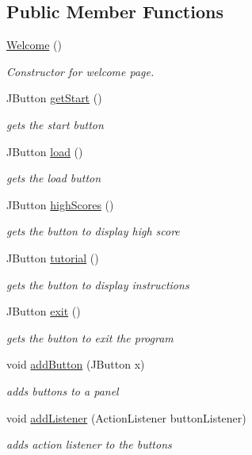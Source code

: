\subsection*{Public Member Functions}
\begin{DoxyCompactItemize}
\item 
\hyperlink{classview_1_1_welcome_ac0d0158b691ccb4dbca2c78145e4a522}{Welcome} ()
\begin{DoxyCompactList}\small\item\em Constructor for welcome page. \end{DoxyCompactList}\item 
J\+Button \hyperlink{classview_1_1_welcome_a8375f9965fb6662e612ea02af51a51a9}{get\+Start} ()
\begin{DoxyCompactList}\small\item\em gets the start button \end{DoxyCompactList}\item 
J\+Button \hyperlink{classview_1_1_welcome_a4a6c30be81cc7a3b081d3e97a4c84356}{load} ()
\begin{DoxyCompactList}\small\item\em gets the load button \end{DoxyCompactList}\item 
J\+Button \hyperlink{classview_1_1_welcome_a5d23e93f1a81a2520d5635ed7d8d5920}{high\+Scores} ()
\begin{DoxyCompactList}\small\item\em gets the button to display high score \end{DoxyCompactList}\item 
J\+Button \hyperlink{classview_1_1_welcome_aaf45e35ac75c1b6f8badd358dd2c2a08}{tutorial} ()
\begin{DoxyCompactList}\small\item\em gets the button to display instructions \end{DoxyCompactList}\item 
J\+Button \hyperlink{classview_1_1_welcome_a78b2940bddd27a89b9462192cbdeaa65}{exit} ()
\begin{DoxyCompactList}\small\item\em gets the button to exit the program \end{DoxyCompactList}\item 
void \hyperlink{classview_1_1_welcome_ac3a30d95eef91daa1df45ccc57d05740}{add\+Button} (J\+Button x)
\begin{DoxyCompactList}\small\item\em adds buttons to a panel \end{DoxyCompactList}\item 
void \hyperlink{classview_1_1_welcome_a0c375320c2042a198ef09c6b8f489ccf}{add\+Listener} (Action\+Listener button\+Listener)
\begin{DoxyCompactList}\small\item\em adds action listener to the buttons \end{DoxyCompactList}\end{DoxyCompactItemize}
